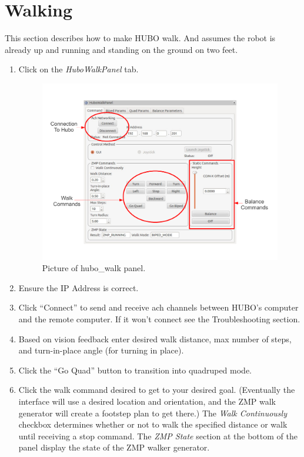 \documentclass[letterpaper, 10 pt]{report}
\begin{document}
\pagebreak
\section{Walking}
This section describes how to make HUBO walk. And assumes the robot is already up and running and standing on the ground on two feet.
  \begin{enumerate}
    \item Click on the \textit{HuboWalkPanel} tab.
    \begin{figure}[ht]
      \centering
      \includegraphics[width=15.0cm]{figures/hubo-walk.pdf}
      \caption{Picture of hubo\_walk panel.}
      \label{fig:hubo-walk-image}
    \end{figure}
    \item Ensure the IP Address is correct.
    \item Click ``Connect'' to send and receive ach channels between HUBO's computer and the remote computer. If it won't connect see the Troubleshooting section.
    \item Based on vision feedback enter desired walk distance, max number of steps, and turn-in-place angle (for turning in place).
    \item Click the ``Go Quad'' button to transition into quadruped mode.
    \item Click the walk command desired to get to your desired goal. (Eventually the interface will use a desired location and orientation, and the ZMP walk generator will create a footstep plan to get there.) The \textit{Walk Continuously} checkbox determines whether or not to walk the specified distance or walk until receiving a stop command. The \textit{ZMP State} section at the bottom of the panel display the state of the ZMP walker generator.

\end{enumerate}
\end{document}
